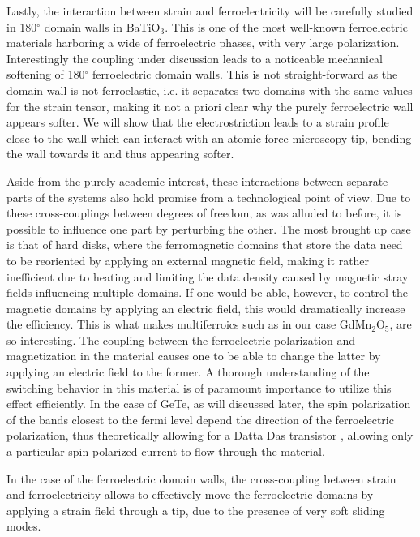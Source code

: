 Lastly, the interaction between strain and ferroelectricity will be carefully studied in 180$^\circ$ domain walls in BaTiO$_3$. This is one of the most well-known ferroelectric materials harboring a wide of ferroelectric phases, with very large polarization. Interestingly the coupling under discussion leads to a noticeable mechanical softening of 180$^\circ$ ferroelectric domain walls. This is not straight-forward as the domain wall is not ferroelastic, i.e. it separates two domains with the same values for the strain tensor, making it not a priori clear why the purely ferroelectric wall appears softer. We will show that the electrostriction leads to a strain profile close to the wall which can interact with an atomic force microscopy tip, bending the wall towards it and thus appearing softer. 

Aside from the purely academic interest, these interactions between separate parts of the systems also hold promise from a technological point of view. Due to these cross-couplings between degrees of freedom, as was alluded to before, it is possible to influence one part by perturbing the other. The most brought up case is that of hard disks, where the ferromagnetic domains that store the data need to be reoriented by applying an external magnetic field, making it rather inefficient due to heating and limiting the data density caused by magnetic stray fields influencing multiple domains. If one would be able, however, to control the magnetic domains by applying an electric field, this would dramatically increase the efficiency. This is what makes multiferroics such as in our case GdMn$_2$O$_5$, are so interesting. The coupling between the ferroelectric polarization and magnetization in the material causes one to be able to change the latter by applying an electric field to the former. A thorough understanding of the switching behavior in this material is of paramount importance to utilize this effect efficiently.
In the case of GeTe, as will discussed later, the spin polarization of the bands closest to the fermi level depend the direction of the ferroelectric polarization, thus theoretically allowing for a Datta Das transistor , allowing only a particular spin-polarized current to flow through the material.

In the case of the ferroelectric domain walls, the cross-coupling between strain and ferroelectricity allows to effectively move the ferroelectric domains by applying a strain field through a tip, due to the presence of very soft sliding modes. 



